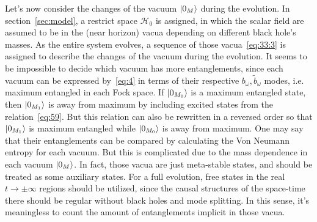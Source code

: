 \documentclass[12pt,a4paper]{article}
\begin{document}
Let's now consider the changes of the vacuum
$\arrowvert0_{M}\rangle$ during the evolution.
In section~\ref{sec:model}, a restrict space $\mathcal {H}_0$ is assigned, in which the scalar
field are assumed to be in the (near horizon) vacua depending on different black hole's masses. As
the entire system evolves, a sequence of those vacua~\eqref{eq:33:3} is assigned to describe the changes of the vacuum during the evolution. It seems to be impossible to decide which vacuum has more entanglements, since each vacuum can be expressed by~\eqref{eq:4} in terms of their
respective $b_{\omega}, \tilde{b}_{\omega}$ modes, i.e. maximum entangled in each Fock space. If
$\arrowvert0_{M_0}\rangle$ is a maximum entangled state, then
$\arrowvert0_{M_1}\rangle$ is away from maximum by including excited
states from the relation~\eqref{eq:59}. But this relation can also be rewritten in a reversed
order so that $\arrowvert0_{M_1}\rangle$ is maximum entangled while
$\arrowvert0_{M_0}\rangle$ is away from maximum. One may say that their entanglements can be compared by calculating the Von Neumann entropy for each vacuum. But this is complicated due to the mass dependence in each vacuum $\arrowvert0_{M}\rangle$. In fact, those vacua are just meta-stable states, and should be treated as some auxiliary states. For a full evolution, free states in the real $t\rightarrow\pm\infty$ regions should be utilized, since the causal structures of the space-time there should be regular without black holes and mode splitting. In this sense, it's meaningless to count the amount of entanglements implicit in those vacua.
\end{document}
